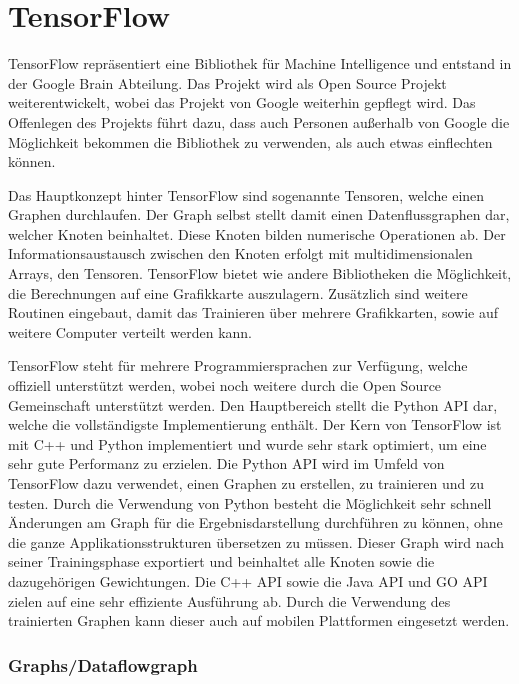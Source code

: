 \chapter{TensorFlow}
\label{cha:TensorFlow}

TensorFlow repräsentiert eine Bibliothek für Machine Intelligence und entstand in der Google Brain Abteilung.
Das Projekt wird als Open Source Projekt weiterentwickelt, wobei das Projekt von Google weiterhin gepflegt wird. 
Das Offenlegen des Projekts führt dazu, dass auch Personen außerhalb von Google die Möglichkeit bekommen die Bibliothek zu verwenden, als auch etwas einflechten können. \newline

\noindent
Das Hauptkonzept hinter TensorFlow sind sogenannte Tensoren, welche einen Graphen durchlaufen. 
Der Graph selbst stellt damit einen Datenflussgraphen dar, welcher Knoten beinhaltet. 
Diese Knoten bilden numerische Operationen ab.
Der Informationsaustausch zwischen den Knoten erfolgt mit multidimensionalen Arrays, den Tensoren.
TensorFlow bietet wie andere Bibliotheken die Möglichkeit, die Berechnungen auf eine Grafikkarte auszulagern.
Zusätzlich sind weitere Routinen eingebaut, damit das Trainieren über mehrere Grafikkarten, sowie auf weitere Computer verteilt werden kann. \newline

\noindent
TensorFlow steht für mehrere Programmiersprachen zur Verfügung, welche offiziell unterstützt werden, wobei noch weitere durch die Open Source Gemeinschaft unterstützt werden.
Den Hauptbereich stellt die Python API dar, welche die vollständigste Implementierung enthält. 
Der Kern von TensorFlow ist mit C++ und Python implementiert und wurde sehr stark optimiert, um eine sehr gute Performanz zu erzielen.
Die Python API wird im Umfeld von TensorFlow dazu verwendet, einen Graphen zu erstellen, zu trainieren und zu testen. 
Durch die Verwendung von Python besteht die Möglichkeit sehr schnell Änderungen am Graph für die Ergebnisdarstellung durchführen zu können, ohne die ganze Applikationsstrukturen übersetzen zu müssen. 
Dieser Graph wird nach seiner Trainingsphase exportiert und beinhaltet alle Knoten sowie die dazugehörigen Gewichtungen. 
Die C++ API sowie die Java API und GO API zielen auf eine sehr effiziente Ausführung ab.
Durch die Verwendung des trainierten Graphen kann dieser auch auf mobilen Plattformen eingesetzt werden.

\subsection{Graphs/Dataflowgraph}

